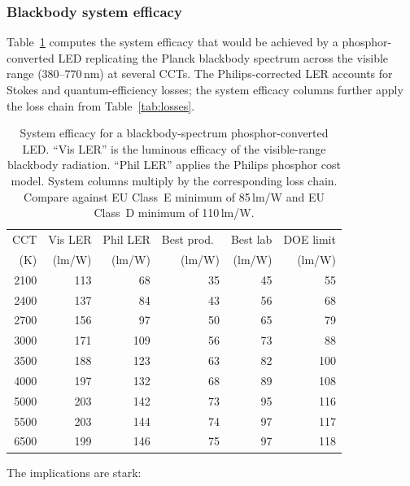 \documentclass[11pt]{article}
\begin{document}
\subsubsection{Blackbody system efficacy}

Table~\ref{tab:bb-system} computes the system efficacy that would be
achieved by a phosphor-converted LED replicating the Planck blackbody
spectrum across the visible range (380--770\,nm) at several CCTs.
The Philips-corrected LER accounts for Stokes and quantum-efficiency
losses; the system efficacy columns further apply the loss chain from
Table~\ref{tab:losses}.

\begin{table}[H]
\centering
\caption{System efficacy for a blackbody-spectrum phosphor-converted LED.
  ``Vis LER'' is the luminous efficacy of the visible-range blackbody
  radiation.  ``Phil LER'' applies the Philips phosphor cost model.
  System columns multiply by the corresponding loss chain.  Compare
  against EU Class~E minimum of 85\,lm/W and EU Class~D minimum of
  110\,lm/W.}
\label{tab:bb-system}
\begin{tabular}{rrrrrr}
\toprule
CCT & Vis LER & Phil LER & Best prod.\ & Best lab & DOE limit \\
(K) & (lm/W) & (lm/W) & (lm/W) & (lm/W) & (lm/W) \\
\midrule
2100 & 113 &  68 &  35 &  45 &  55 \\
2400 & 137 &  84 &  43 &  56 &  68 \\
2700 & 156 &  97 &  50 &  65 &  79 \\
3000 & 171 & 109 &  56 &  73 &  88 \\
3500 & 188 & 123 &  63 &  82 & 100 \\
4000 & 197 & 132 &  68 &  89 & 108 \\
5000 & 203 & 142 &  73 &  95 & 116 \\
5500 & 203 & 144 &  74 &  97 & 117 \\
6500 & 199 & 146 &  75 &  97 & 118 \\
\bottomrule
\end{tabular}
\end{table}

The implications are stark:
\end{document}
